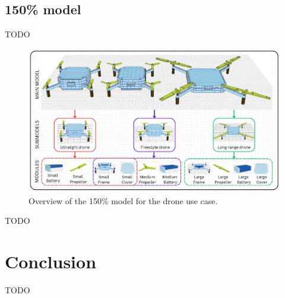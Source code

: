 \documentclass[sigconf,review]{acmart}
\begin{document}
\subsection{150\% model}
\label{sec:150-model}

TODO

\begin{figure}[htbp]
    \includegraphics[width=\textwidth]{./150_MODEL_3.jpg}
    \caption{Overview of the 150\% model for the drone use case.}
    \label{fig:150-model}
\end{figure}

TODO

\section{Conclusion}
\label{sec:conclusion}

TODO



\end{document}
